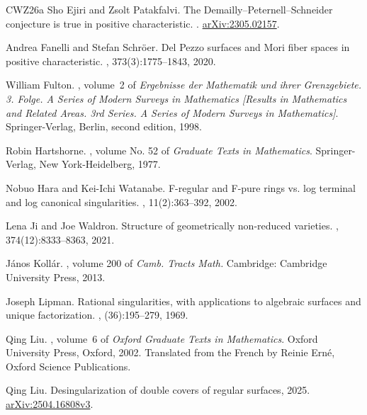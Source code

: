 \documentclass[reqno,oneside]{amsart}
\theoremstyle{definition}
\theoremstyle{plain}
\numberwithin{equation}{section}
\begin{document}
\begin{thebibliography}{CWZ26a}
Sho Ejiri and Zsolt Patakfalvi.
\newblock The {Demailly--Peternell--Schneider} conjecture is true in positive characteristic.
.
\newblock \href{https://arxiv.org/abs/2305.02157}{arXiv:2305.02157}.

Andrea Fanelli and Stefan Schr\"{o}er.
\newblock Del {P}ezzo surfaces and {M}ori fiber spaces in positive characteristic.
, 373(3):1775--1843, 2020.

William Fulton.
, volume~2 of {\em Ergebnisse der Mathematik und ihrer Grenzgebiete. 3. Folge. A Series of Modern Surveys in Mathematics [Results in Mathematics and Related Areas. 3rd Series. A Series of Modern Surveys in Mathematics]}.
\newblock Springer-Verlag, Berlin, second edition, 1998.

Robin Hartshorne.
, volume No. 52 of {\em Graduate Texts in Mathematics}.
\newblock Springer-Verlag, New York-Heidelberg, 1977.

Nobuo Hara and Kei-Ichi Watanabe.
\newblock F-regular and {F}-pure rings vs. log terminal and log canonical singularities.
, 11(2):363--392, 2002.

Lena Ji and Joe Waldron.
\newblock Structure of geometrically non-reduced varieties.
, 374(12):8333--8363, 2021.

J{\'a}nos Koll{\'a}r.
, volume 200 of {\em Camb. Tracts Math.}
\newblock Cambridge: Cambridge University Press, 2013.

Joseph Lipman.
\newblock Rational singularities, with applications to algebraic surfaces and unique factorization.
, (36):195--279, 1969.

Qing Liu.
, volume~6 of {\em Oxford Graduate Texts in Mathematics}.
\newblock Oxford University Press, Oxford, 2002.
\newblock Translated from the French by Reinie Ern\'{e}, Oxford Science Publications.

Qing Liu.
\newblock Desingularization of double covers of regular surfaces, 2025.
\newblock \href{https://arxiv.org/abs/2504.16808v3}{arXiv:2504.16808v3}.


\end{thebibliography}
\end{document}
